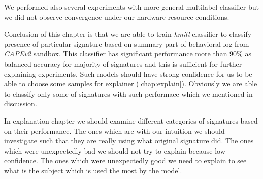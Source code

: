 We performed also several experiments with more general multilabel classifier but we did not observe convergence under our hardware resource conditions.

Conclusion of this chapter is that we are able to train \emph{hmill} classifier to classify presence of particular signature based on summary part of behavioral log from \emph{CAPEv2} sandbox. This classifier has significant performance more than $90\%$ as balanced accuracy for majority of signatures and this is sufficient for further explaining experiments. Such models should have strong confidence for us to be able to choose some samples for explainer (\ref{chap:explain}). Obviously we are able to classify only some of signatures with such performace which we mentioned in discussion.

In explanation chapter we should examine different categories of signatures based on their performance. The ones which are with our intuition we should investigate such that they are really using what original signature did. The ones which were unexpectedly bad we should not try to explain because low confidence. The ones which were unexpectedly good we need to explain to see what is the subject which is used the most by the model.












